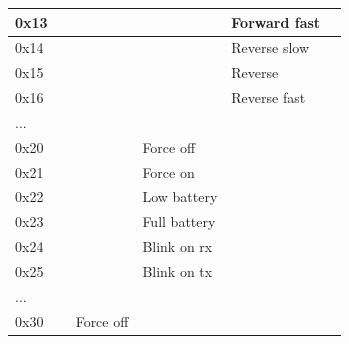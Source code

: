 \documentclass[a4paper]{article}
\begin{document}
\begin{table}[h]
\begin{tabular}{|l|l|l|l|l|l|}
               0x13           &                       &                       &                    &  Forward fast         &                       \\ \hline   
               0x14           &                       &                       &                    &  Reverse slow         &                       \\ \hline   
               0x15           &                       &                       &                    &  Reverse              &                       \\ \hline   
               0x16           &                       &                       &                    &  Reverse fast         &                       \\ \hline   
               ...            &                       &                       &                    &                       &                       \\ \hline   
               0x20           &                       &                       &  Force off         &                       &                       \\ \hline   
               0x21           &                       &                       &  Force on          &                       &                       \\ \hline   
               0x22           &                       &                       &  Low battery       &                       &                       \\ \hline   
               0x23           &                       &                       &  Full battery      &                       &                       \\ \hline   
               0x24           &                       &                       &  Blink on rx       &                       &                       \\ \hline   
               0x25           &                       &                       &  Blink on tx       &                       &                       \\ \hline   
               ...            &                       &                       &                    &                       &                       \\ \hline   
               0x30           &                       &  Force off            &                    &                       &                       \\ \hline   

\end{tabular}
\end{table}
\end{document}
